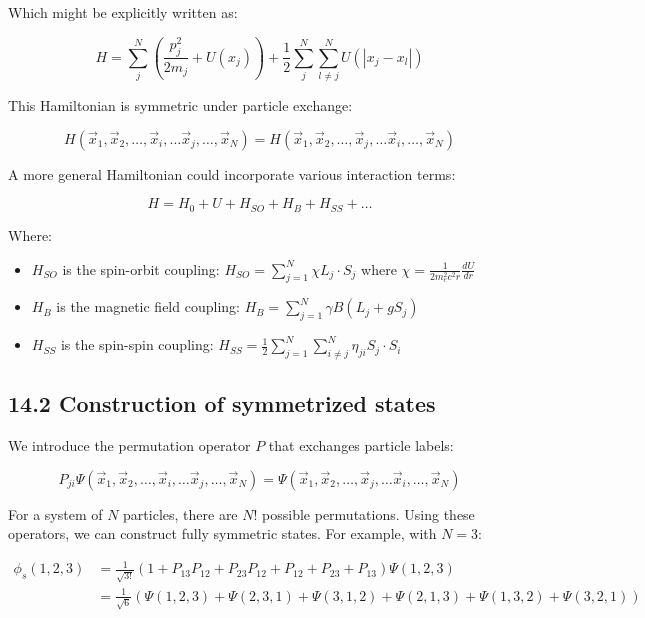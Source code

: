 \documentclass[italian]{HKNdocument}
\begin{document}
Which might be explicitly written as:

\begin{equation*}
H=\sum_{j}^{N}(\frac{p_j^2}{2m_j}+U(x_j))+\frac{1}{2}\sum_{j}^{N}\sum_{l\neq j}^{N}U(|x_j-x_l|) \tag{14.2}
\end{equation*}

This Hamiltonian is symmetric under particle exchange:

\begin{equation*}
H(\vec{x}_1,\vec{x}_2,\ldots,\vec{x}_i,\ldots\vec{x}_j,\ldots,\vec{x}_N)=H(\vec{x}_1,\vec{x}_2,\ldots,\vec{x}_j,\ldots\vec{x}_i,\ldots,\vec{x}_N) \tag{14.3}
\end{equation*}


A more general Hamiltonian could incorporate various interaction terms:

\begin{equation*}
H=H_0+U+H_{SO}+H_B+H_{SS}+\ldots \tag{14.4}
\end{equation*}

Where:
\begin{itemize}
  \item $H_{SO}$ is the spin-orbit coupling: $H_{SO}=\sum_{j=1}^{N}\chi L_j\cdot S_j$ where $\chi=\frac{1}{2m_e^2c^2r}\frac{dU}{dr}$
  \item $H_B$ is the magnetic field coupling: $H_B=\sum_{j=1}^{N}\gamma B(L_j+gS_j)$
  \item $H_{SS}$ is the spin-spin coupling: $H_{SS}=\frac{1}{2}\sum_{j=1}^{N}\sum_{i\neq j}^{N}\eta_{ji}S_j\cdot S_i$
\end{itemize}

\subsection*{14.2 Construction of symmetrized states}
We introduce the permutation operator $P$ that exchanges particle labels:

\begin{equation*}
P_{ji}\Psi(\vec{x}_1,\vec{x}_2,\ldots,\vec{x}_i,\ldots\vec{x}_j,\ldots,\vec{x}_N)=\Psi(\vec{x}_1,\vec{x}_2,\ldots,\vec{x}_j,\ldots\vec{x}_i,\ldots,\vec{x}_N) \tag{14.5}
\end{equation*}

For a system of $N$ particles, there are $N!$ possible permutations. Using these operators, we can construct fully symmetric states. For example, with $N=3$:

\begin{align*}
\phi_s(1,2,3)&=\frac{1}{\sqrt{3!}}(1+P_{13}P_{12}+P_{23}P_{12}+P_{12}+P_{23}+P_{13})\Psi(1,2,3)\\
&=\frac{1}{\sqrt{6}}(\Psi(1,2,3)+\Psi(2,3,1)+\Psi(3,1,2)+\Psi(2,1,3)+\Psi(1,3,2)+\Psi(3,2,1)) \tag{14.6}
\end{align*}
\end{document}
